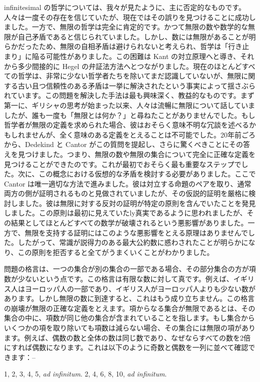 \documentclass[a4paper,11pt,openany]{ltjsbook}
\begin{document}
 infinitesimal の哲学については、我々が見たように、主に否定的なものです。人々は一度その存在を信じていたが、現在ではその誤りを見つけることに成功しました。一方で、無限の哲学は完全に肯定的です。かつて無限の数や数学的な無限が自己矛盾であると信じられていました。しかし、数には無限があることが明らかだったため、無限の自相矛盾は避けられないと考えられ、哲学は「行き止まり」に陥る可能性がありました。この困難は Kant の対立原理へと導き、それから多少間接的に Hegel の弁証法方法へとつながりました。現在のほとんどすべての哲学は、非常に少ない哲学者たちを除いてまだ認識していないが、無限に関する古い且つ信頼性のある矛盾は一挙に解決されたという事実によって揺さぶられています。この問題を解決した手法は最も興味深く、教益的なものです。まず第一に、ギリシャの思考が始まった以来、人々は流暢に無限について話していましたが、誰も一度も「無限とは何か？」と尋ねたことがありませんでした。もし哲学者が無限の定義を求められた場合、彼はおそらく意味不明な冗談を述べるかもしれませんが、全く意味のある定義をとえることは不可能でした。20年前ごろから、Dedekind と Cantor がこの質問を提起し、さらに驚くべきことにその答えを見つけました。つまり、無限の数や無限の集合について完全に正確な定義を見つけることができたのです。これが最初でおそらく最も重要なステップでした。次に、この概念における仮想的な矛盾を検討する必要がありました。ここで Cantor は唯一適切な方法で進みました。彼は対立する命題のペアを取り、通常両方の側が証明されるものと見做されていましたが、その仮説的証明を厳格に検討しました。彼は無限に対する反対の証明が特定の原則を含んでいたことを発見しました。この原則は最初に見えていたly真実であるように思われましたが、その結果としてほとんどすべての数学が破壊されるという悪影響がありました。一方で、無限を支持する証明にはこのような悪影響をとえる原理はありませんでした。したがって、常識が説得力のある最大公約数に惑わされたことが明らかになり、この原則を拒否すると全てがうまくいくことがわかりました。

問題の格言は、一つの集合が別の集合の一部である場合、その部分集合の方が項数が少ないという点です。この格言は有限な数に対して真です。例えば、イギリス人はヨーロッパ人の一部であり、イギリス人がヨーロッパ人よりも少ない数があります。しかし無限の数に到達すると、これはもう成り立ちません。この格言の崩壊が無限の正確な定義をとえます。項からなる集合が無限であるとは、その集合の中に、項数が同じ他の集合が含まれていることを指します。もし集合からいくつかの項を取り除いても項数は減らない場合、その集合には無限の項があります。例えば、偶数の数と全体の数は同じ数であり、なぜならすべての数を2倍にすれば偶数になります。これは以下のように奇数と偶数を一列に並べて確認できます：--

          1, 2, 3, 4, 5, \textit{ad infinitum}.
          2, 4, 6, 8, 10, \textit{ad infinitum}.
\end{document}
